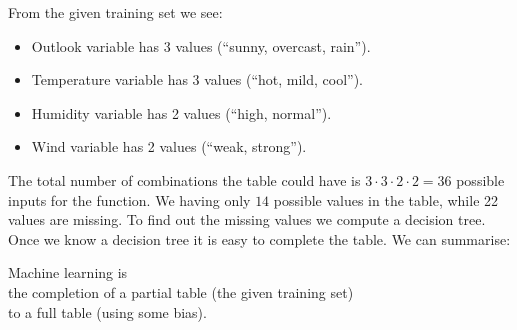 \documentclass{report}
\begin{document}
From the given training set we see:
\begin{itemize}
\item Outlook variable has 3 values (``sunny, overcast, rain'').
\item Temperature variable has 3 values (``hot, mild, cool'').
\item Humidity variable has 2 values (``high, normal'').
\item Wind variable has 2 values (``weak, strong'').
\end{itemize}
The total number of combinations the table could have is $3 \cdot 3 \cdot 2 \cdot 2 = 36$ possible inputs for the function. We having only $14$ possible values in the table, while 22 values are missing. To find out the missing values we compute a decision tree. Once we know a decision tree it is easy to complete the table. We can summarise:
\begin{center}
  Machine learning is\\
  the completion of a partial table (the given training set)\\
  to a full table (using some bias).
\end{center}
\end{document}
